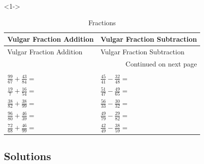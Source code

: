 \documentclass[ngerman,xcolor={table,dvipsnames},smaller,compress,hyperref={bookmarks,colorlinks}]{beamer}
\begin{document}
\begin{frame}[t,fragile]

\begin{block}<1->{}

\footnotesize
\begin{longtable}[l]{p{5cm}|p{5cm}}
\toprule
Vulgar Fraction Addition & Vulgar Fraction Subtraction \\
\midrule
\endfirsthead

\toprule
Vulgar Fraction Addition & Vulgar Fraction Subtraction \\
\midrule
\endhead
\midrule
\multicolumn{2}{r}{{Continued on next page}} \\
\bottomrule
\endfoot

\caption{Fractions\label{vulgar_fractions_addition}}\\
\endlastfoot
$ \frac{99}{67} + \frac{43}{84} = $ & $ \frac{45}{41} - \frac{32}{48} = $ \\
$ \frac{19}{7} + \frac{16}{54} = $  & $ \frac{51}{47} - \frac{49}{65} = $ \\
$ \frac{38}{82} + \frac{38}{99} = $ & $ \frac{56}{33} - \frac{30}{32} = $ \\
$ \frac{96}{80} + \frac{46}{39} = $ & $ \frac{49}{79} - \frac{29}{82} = $ \\
$ \frac{72}{68} + \frac{46}{99} = $ & $ \frac{42}{49} - \frac{38}{59} = $ \\
\bottomrule
\end{longtable}

\end{block}

\end{frame}

\subsection{Solutions}
\end{document}
